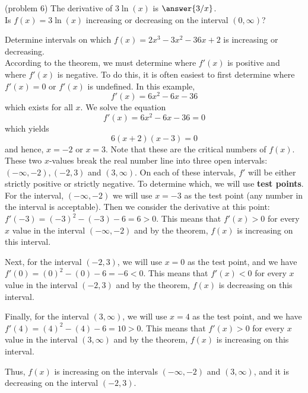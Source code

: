 \documentclass[handout]{ximera}
\begin{document}
\begin{problem}(problem 6)
The derivative of $3\ln(x)$ is $\answer{3/x}$.\\
Is $f(x) = 3\ln(x)$ increasing or decreasing on the interval $(0, \infty)$?
\begin{multipleChoice}
\end{multipleChoice}
\end{problem}



\begin{example}[example 7]
Determine intervals on which $f(x) = 2x^3 - 3x^2  - 36x + 2$ is increasing or decreasing.\\
According to the theorem, we must determine where $f'(x)$ is positive and  
where $f'(x)$ is negative. 
To do this, it is often easiest to first determine where $f'(x) = 0$ or 
$f'(x)$ is undefined. In this example, 
\[f'(x) = 6x^2 - 6x -36\] 
which exists for all $x$. We solve the equation
\[f'(x) = 6x^2 - 6x -36 = 0\] 
which yields 
\[6(x+2)(x-3) = 0\] 
and hence, $x=-2$ or $x=3$. 
Note that these are the critical numbers of $f(x)$.
These two $x$-values break the real number line into three open 
intervals: $(-\infty, -2), (-2, 3)$ and $(3, \infty)$.
On each of these intervals, $f'$ will be either strictly positive or strictly negative.  
To determine which, we will use \textbf{test points}. 
For the interval, $(-\infty, -2)$ we will use $x=-3$ as the test 
point (any number in the interval is acceptable). 
Then we consider the derivative at this point: $f'(-3) = (-3)^2 - (-3) -6 = 6 >0$.
This means that $f'(x) > 0$ for every $x$ value in the interval $(-\infty, -2)$ and by the theorem, 
$f(x)$ is increasing on this interval.

Next, for the interval $(-2, 3)$, we will use $x=0$ as the test point, 
and we have $f'(0) = (0)^2 - (0) -6 = -6 <0$. 
This means that $f'(x) < 0$ for every $x$ value in the interval $(-2, 3)$ and by the theorem, 
$f(x)$ is decreasing on this interval.


Finally, for the interval $(3, \infty)$, we will use $x=4$ as the test point, and we 
have $f'(4) = (4)^2 - (4) -6 = 10>0$. 
This means that $f'(x) > 0$ for every $x$ value in the interval $(3, \infty)$ and by the theorem, 
$f(x)$ is increasing on this interval.


\begin{image}
\end{image}


Thus, $f(x)$ is increasing on the intervals $(-\infty, -2)$ and $(3, \infty)$,
and it is decreasing on the interval $(-2, 3)$.
\end{example}
\end{document}
